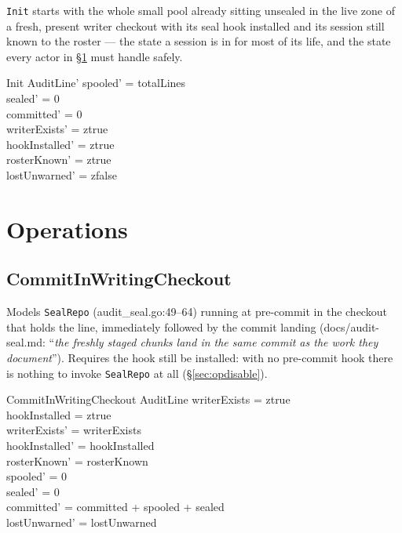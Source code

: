 \documentclass[a4paper,10pt,fleqn]{article}
\newcommand{\field}[1]{\ifmmode\texttt{#1}\else\texorpdfstring{\breakfield{#1}}{#1}\fi}
\begin{document}
\field{Init} starts with the whole small pool already sitting unsealed in
the live zone of a fresh, present writer checkout with its seal hook
installed and its session still known to the roster --- the state a session
is in for most of its life, and the state every actor in \S\ref{sec:ops}
must handle safely.

\begin{schema}{Init}
AuditLine'
\where
spooled' = totalLines \\
sealed' = 0 \\
committed' = 0 \\
writerExists' = ztrue \\
hookInstalled' = ztrue \\
rosterKnown' = ztrue \\
lostUnwarned' = zfalse
\end{schema}

\section{Operations}
\label{sec:ops}

\subsection{CommitInWritingCheckout}
\label{sec:opcommitwriting}

Models \field{SealRepo} (audit\_seal.go:49--64) running at pre-commit in
the checkout that holds the line, immediately followed by the commit
landing (docs/audit-seal.md: ``\emph{the freshly staged chunks land in the
same commit as the work they document}''). Requires the hook still be
installed: with no pre-commit hook there is nothing to invoke
\field{SealRepo} at all (\S\ref{sec:opdisable}).

\begin{schema}{CommitInWritingCheckout}
\Delta AuditLine
\where
writerExists = ztrue \\
hookInstalled = ztrue \\
writerExists' = writerExists \\
hookInstalled' = hookInstalled \\
rosterKnown' = rosterKnown \\
spooled' = 0 \\
sealed' = 0 \\
committed' = committed + spooled + sealed \\
lostUnwarned' = lostUnwarned
\end{schema}
\end{document}
